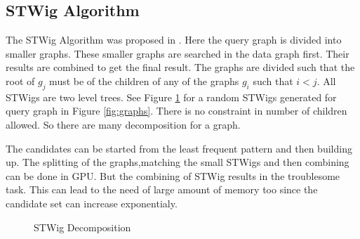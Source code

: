 \subsection{STWig Algorithm}
\label{sec:stwig}
	\hspace{10mm}The STWig Algorithm was proposed in \cite{STWig}. Here the query graph is divided into smaller graphs. These smaller graphs are searched in the data graph first. Their results are combined to get the final result. The graphs are divided such that the root of $g_j$ must be of the children of any of the graphs $g_i$ such that $i<j$. All STWigs are two level trees. See Figure \ref{fig:stwig} for a random STWigs generated for query graph in Figure \ref{fig:graphs}. There is no constraint in number of children allowed. So there are many decomposition for a graph.
	 \par The candidates can be started from the least frequent pattern and then building up. The splitting of the graphs,matching the small STWigs and then combining can be done in GPU. But the combining of STWig results in the troublesome task. This can lead to the need of large amount of memory too since the candidate set can increase exponentialy.
	\begin{figure}[h]
 \centering
\begin{minipage}{.24\textwidth}
\end{minipage}
\begin{minipage}{.24\textwidth}
\end{minipage}
\begin{minipage}{.24\textwidth}
\end{minipage}
\begin{minipage}{.24\textwidth}
\end{minipage}
 \caption{STWig Decomposition}
 \label{fig:stwig}
\end{figure}
\hspace{10mm} 
